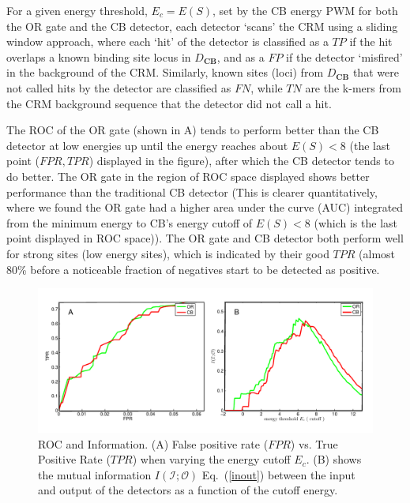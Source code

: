 For a given energy threshold, $E_c=E(S)$, set by the CB energy PWM for both the OR gate and the CB detector, each detector `scans' the CRM using a sliding window approach, where each `hit' of the detector is classified as a $TP$ if the hit overlaps a known binding site locus in $D_{\textbf{CB}}$, and as a $FP$ if the detector `misfired' in the background of the CRM.  Similarly, known sites (loci) from $D_{\textbf{CB}}$ that were not called hits by the detector are classified as $FN$, while $TN$ are the k-mers from the CRM background sequence that the detector did not call a hit.

The ROC of the OR gate (shown in A) tends to perform better than the CB detector at low energies up until the energy reaches about $E(S) < 8$ (the last point ($FPR,TPR$) displayed in the figure), after which the CB detector tends to do better.  The OR gate in the region of ROC space displayed shows better performance than the traditional CB detector (This is clearer quantitatively, where we found the OR gate had a higher area under the curve (AUC) integrated from the minimum energy to CB's energy cutoff of $E(S) < 8$ (which is the last point displayed in ROC space)).  The OR gate and CB detector both perform well for strong sites (low energy sites), which is indicated by their good $TPR$ (almost 80\% before a noticeable fraction of negatives start to be detected as positive.
\begin{figure}
\includegraphics[width=6in]{infopair.pdf}
\caption{ROC and Information. (A) False positive rate ($FPR$) vs. True Positive Rate ($TPR$) when varying the energy cutoff $E_c$.  (B) shows the mutual information $I(\mathcal I;\mathcal O)$ Eq.~(\ref{inout}) between the input and output of the detectors as a function of the cutoff energy. }\label{rocfig}
\end{figure}


